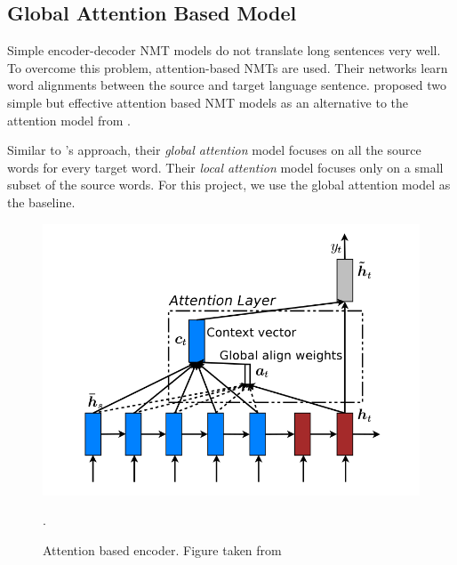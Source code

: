 





\subsection{Global Attention Based Model}
Simple encoder-decoder NMT models \citep{sutskever2014sequence,cho2014learning} do not translate long sentences very well. To overcome this problem, attention-based NMTs are used. Their networks learn word alignments between the source and target language sentence.  \cite{luong2015effective} proposed two simple but effective attention based NMT models as an alternative to the attention model from \cite{bahdanau2014neural}. 

Similar to \citeauthor{bahdanau2014neural}'s approach, their \textit{global attention} model focuses on all the source words for every target word. Their \textit{local attention} model focuses only on a small subset of the source words. For this project, we use the global attention model as the baseline.


\begin{figure}[ht]
	\centering
	\includegraphics[scale=0.5]{images/global_attention}
	\caption{Attention based encoder. Figure taken from \cite{luong2015effective}}.
	\label{global_attention}
\end{figure}

